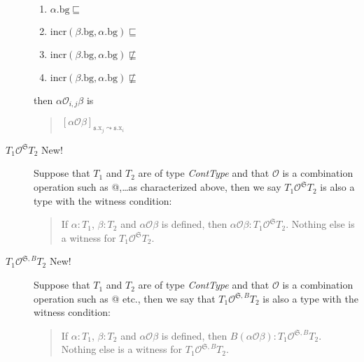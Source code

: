 \begin{description}
\begin{enumerate}
\item $\alpha.\text{bg}\sqsubseteq$
\item $\mathrm{incr}(\beta.\text{bg},\alpha.\text{bg})\sqsubseteq$
\item $\mathrm{incr}(\beta.\text{bg},\alpha.\text{bg})\not\sqsubseteq$
\item $\mathrm{incr}(\beta.\text{bg},\alpha.\text{bg})\not\sqsubseteq$
\end{enumerate}
then $\alpha\mathcal{O}_{i,j}\beta$ is
\begin{quote}
  $[\alpha\mathcal{O}\beta]_{\mathfrak{s}.\text{x}_j\leadsto\mathfrak{s}.\text{x}_i}$
\end{quote}


      
    \item[\textnormal{$T_1\mathcal{O}^{\mathfrak{S}}T_2$} New!]
      \mbox{}

      Suppose that $T_1$ and
$T_2$ are of type \textit{ContType} and that $\mathcal{O}$ is a combination
operation such as @,\ldots as characterized above, then we say $T_1\mathcal{O}^{\mathfrak{S}}T_2$
is also a type with the witness condition:
\begin{quote} 
If $\alpha:T_1$, $\beta:T_2$ and $\alpha\mathcal{O}\beta$ is defined,
then $\alpha\mathcal{O}\beta:T_1\mathcal{O}^{\mathfrak{S}}T_2$.
Nothing else is a witness for $T_1\mathcal{O}^{\mathfrak{S}}T_2$. 
\end{quote}

\item[\textnormal{$T_1\mathcal{O}^{\mathfrak{S},B}T_2$} New!] \mbox{}

  Suppose that $T_1$ and $T_2$ are of type \textit{ContType} and that
$\mathcal{O}$ is a combination operation such as @ etc., then we say
that $T_1\mathcal{O}^{\mathfrak{S},B}T_2$ is also a type with the
witness condition:
\begin{quote} 
If $\alpha:T_1$, $\beta:T_2$ and $\alpha\mathcal{O}\beta$ is defined,
then $B(\alpha\mathcal{O}\beta):T_1\mathcal{O}^{\mathfrak{S},B}T_2$.
Nothing else is a witness for $T_1\mathcal{O}^{\mathfrak{S},B}T_2$. 
\end{quote} 



\end{description}
